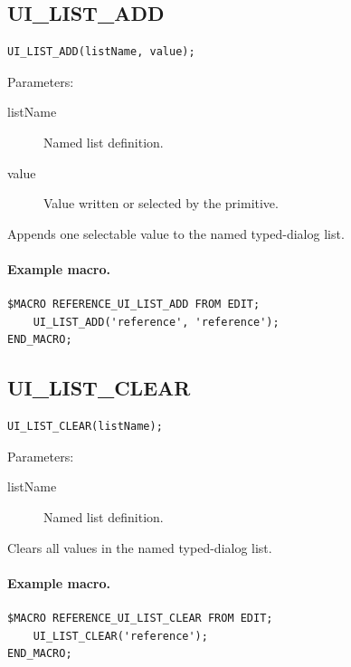 \documentclass[a4paper,10pt,twoside,openany]{book}
\newenvironment{mrmacextension}{\begin{changebar}}{\end{changebar}}
\begin{document}
\begin{mrmacextension}
\label{prim:procedure-ui-list-add}
\subsection*{UI\_LIST\_ADD}
\begin{verbatim}
UI_LIST_ADD(listName, value);
\end{verbatim}
Parameters:
\begin{description}
\item[listName] Named list definition.
\item[value] Value written or selected by the primitive.
\end{description}

Appends one selectable value to the named typed-dialog list.

\paragraph{Example macro.}
\begin{verbatim}
$MACRO REFERENCE_UI_LIST_ADD FROM EDIT;
    UI_LIST_ADD('reference', 'reference');
END_MACRO;
\end{verbatim}
\end{mrmacextension}

\begin{mrmacextension}
\label{prim:procedure-ui-list-clear}
\subsection*{UI\_LIST\_CLEAR}
\begin{verbatim}
UI_LIST_CLEAR(listName);
\end{verbatim}
Parameters:
\begin{description}
\item[listName] Named list definition.
\end{description}

Clears all values in the named typed-dialog list.

\paragraph{Example macro.}
\begin{verbatim}
$MACRO REFERENCE_UI_LIST_CLEAR FROM EDIT;
    UI_LIST_CLEAR('reference');
END_MACRO;
\end{verbatim}
\end{mrmacextension}
\end{document}
